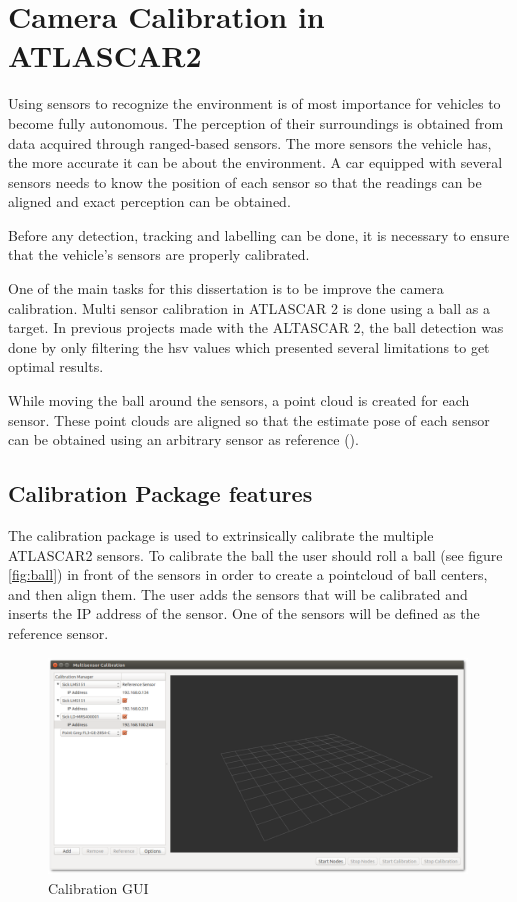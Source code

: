 \chapter{Camera Calibration in ATLASCAR2}

Using sensors to recognize the environment is of most importance for vehicles to become fully autonomous. The perception of their surroundings is obtained from data acquired through ranged-based sensors. The more sensors the vehicle has, the more accurate it can be about the environment. A car equipped with several sensors needs to know the position of each sensor so that the readings can be aligned and exact perception can be obtained. 

Before any detection, tracking and labelling can be done, it is necessary to ensure that the vehicle's sensors are properly calibrated.

One of the main tasks for this dissertation is to be improve the camera calibration. Multi sensor calibration in ATLASCAR 2 is done using a ball as a target. In previous projects made with the ALTASCAR 2, the ball detection was done by only filtering the \gls{hsv} values which presented several limitations to get optimal results. 

While moving the ball around the sensors, a point cloud is created for each sensor. These point clouds are aligned so that the estimate pose of each sensor can be obtained using an arbitrary sensor as reference (\cite{VieiradaSilva2016}).

\section{Calibration Package features}

The calibration package is used to extrinsically calibrate the multiple ATLASCAR2 sensors. To calibrate the ball the user should roll a ball (see figure \ref{fig:ball}) in front of the sensors in order to create a pointcloud of ball centers, and then align them. The user adds the sensors that will be calibrated and inserts the IP address of the sensor. One of the sensors will be defined as the reference sensor. 

\begin{figure}[htp]
	
	\centering
	\includegraphics[width=0.99\textwidth]{capcalib/imgs/calibgui.png}
	
	\caption{Calibration GUI}
	\label{fig:calibgui}
	
\end{figure}

